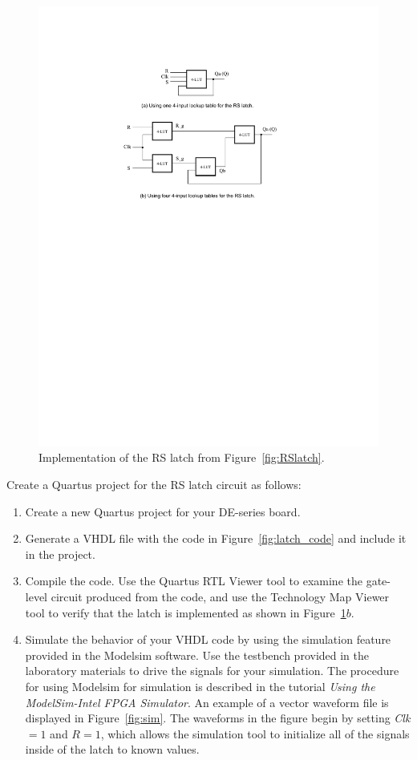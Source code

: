 \documentclass[epsfig,10pt,fullpage]{article}
\begin{document}
\begin{figure}[H]
	\begin{center}
		\includegraphics[scale=0.9]{figures/figure3.pdf}
	\end{center}
	\caption{Implementation of the RS latch from Figure~\ref{fig:RSlatch}.}
\label{fig:RSlatch_cct}
\end{figure}

Create a Quartus project for the RS latch circuit as follows:
\begin{enumerate}
\item Create a new Quartus project for your DE-series board.
\item Generate a VHDL file with the code in Figure~\ref{fig:latch_code}
and include it in the project. 
\item Compile the code. Use the Quartus RTL Viewer tool to examine the gate-level
circuit produced from the code, and use the Technology Map Viewer tool
to verify that the latch is implemented as shown in Figure~\ref{fig:RSlatch_cct}$b$.

\item Simulate the behavior of your VHDL code by using the simulation feature provided
in the Modelsim software. Use the testbench provided in the laboratory materials to drive
the signals for your simulation. The procedure for using Modelsim for simulation is
described in the tutorial {\it Using the ModelSim-Intel FPGA Simulator}. An example of a
vector waveform file is displayed in Figure~\ref{fig:sim}. The waveforms in the figure
begin by setting {\it Clk} $= 1$ and $R = 1$, which allows the simulation tool to
initialize all of the signals inside of the latch to known values. 
\end{enumerate}
\end{document}
